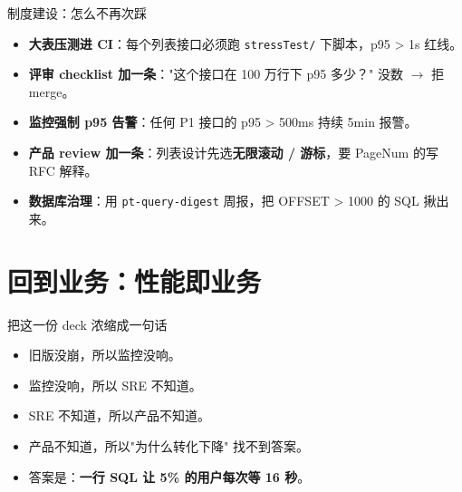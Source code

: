 \begin{frame}{制度建设：怎么不再次踩}
\begin{itemize}
  \item \textbf{大表压测进 CI}：每个列表接口必须跑 \texttt{stressTest/} 下脚本，p95 > 1s 红线。
  \item \textbf{评审 checklist 加一条}："这个接口在 100 万行下 p95 多少？" 没数 $\to$ 拒 merge。
  \item \textbf{监控强制 p95 告警}：任何 P1 接口的 p95 > 500ms 持续 5min 报警。
  \item \textbf{产品 review 加一条}：列表设计先选\textbf{无限滚动 / 游标}，要 PageNum 的写 RFC 解释。
  \item \textbf{数据库治理}：用 \texttt{pt-query-digest} 周报，把 OFFSET > 1000 的 SQL 揪出来。
\end{itemize}
\end{frame}

\section{回到业务：性能即业务}

\begin{frame}{把这一份 deck 浓缩成一句话}
\begin{itemize}
  \item 旧版没崩，所以监控没响。
  \item 监控没响，所以 SRE 不知道。
  \item SRE 不知道，所以产品不知道。
  \item 产品不知道，所以"为什么转化下降" 找不到答案。
  \item 答案是：\textbf{一行 SQL 让 5\% 的用户每次等 16 秒}。
\end{itemize}
\end{frame}

\appendix

